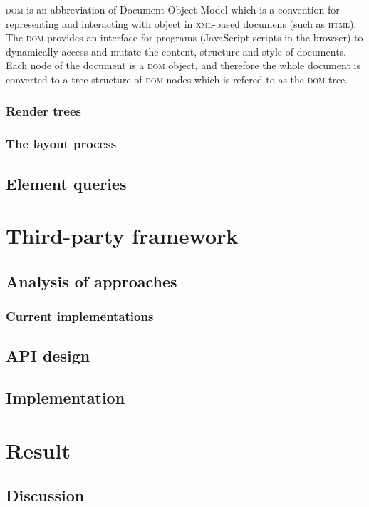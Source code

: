 \documentclass[a4paper,11pt]{kth-mag}
\begin{document}
        \textsc{dom} is an abbreviation of Document Object Model which is a convention for representing and interacting with object in \textsc{xml}-based documens (such as \textsc{html}).
        The \textsc{dom} provides an interface for programs (JavaScript scripts in the browser) to dynamically access and mutate the content, structure and style of documents.
        Each node of the document is a \textsc{dom} object, and therefore the whole document is converted to a tree structure of \textsc{dom} nodes which is refered to as the \textsc{dom} tree.

      \section{Render trees}\label{sec:render-tree}

      \section{The layout process}

    \chapter{Element queries}
  \part{Third-party framework}
    \chapter{Analysis of approaches}
    \section{Current implementations}
    \chapter{API design}
    \chapter{Implementation}
  \part{Result}
    \chapter{Discussion}
  \printbibliography
    \appendix
    \addappheadtotoc
\end{document}
